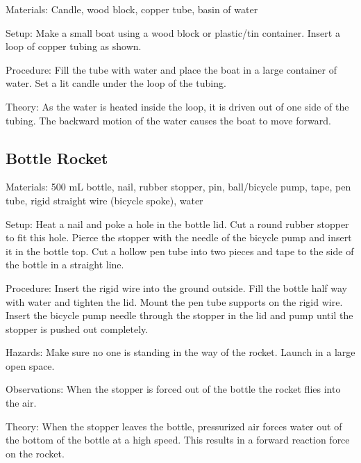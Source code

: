 \begin{multicols}{2}
\begin{description*}
\item[Materials:]{Candle, wood block, copper tube, basin of water}
\item[Setup:]{Make a small boat using a wood block or plastic/tin container. Insert a loop of copper tubing as shown.}
\item[Procedure:]{Fill the tube with water and place the boat in a large container of water. Set a lit candle under the loop of the tubing.}
\item[Theory:]{As the water is heated inside the loop, it is driven out of one side of the tubing. The backward motion of the water causes the boat to move forward.}
\end{description*}

\subsection{Bottle Rocket} 


\begin{description*}
\item[Materials:]{500 mL bottle, nail, rubber stopper, pin, ball/bicycle pump, tape, pen tube, rigid straight wire (bicycle spoke), water}
\item[Setup:]{Heat a nail and poke a hole in the bottle lid. Cut a round rubber stopper to fit this hole. Pierce the stopper with the needle of the bicycle pump and insert it in the bottle top. Cut a hollow pen tube into two pieces and tape to the side of the bottle in a straight line.}
\item[Procedure:]{Insert the rigid wire into the ground outside. Fill the bottle half way with water and tighten the lid. Mount the pen tube supports on the rigid wire. Insert the bicycle pump needle through the stopper in the lid and pump until the stopper is pushed out completely.}
\item[Hazards:]{Make sure no one is standing in the way of the rocket. Launch in a large open space.}
\item[Observations:]{When the stopper is forced out of the bottle the rocket flies into the air.}
\item[Theory:]{When the stopper leaves the bottle, pressurized air forces water out of the bottom of the bottle at a high speed. This results in a forward reaction force on the rocket.}
\end{description*}


\end{multicols}
